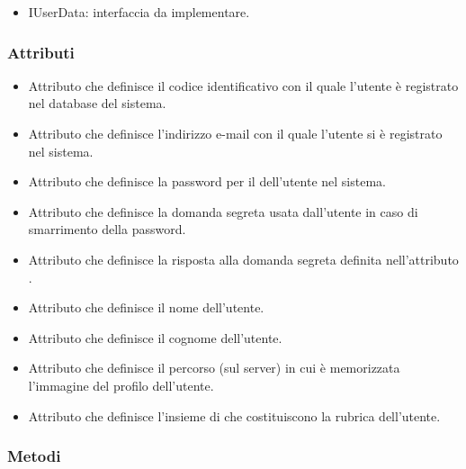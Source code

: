 \begin{itemize}
	\item{IUserData}: interfaccia da implementare.
\end{itemize}

\subsubsection*{Attributi}

\begin{itemize}
	\item{}
	Attributo che definisce il codice identificativo con il quale l'utente è registrato nel database del sistema.
	\item{}
	Attributo che definisce l'indirizzo e-mail con il quale l'utente si è registrato nel sistema.
	\item{}
	Attributo che definisce la password per il  dell'utente nel sistema.
	\item{}
	Attributo che definisce la domanda segreta usata dall'utente in caso di smarrimento della password.
	\item{}
	Attributo che definisce la risposta alla domanda segreta definita nell'attributo .
	\item{}
	Attributo che definisce il nome dell'utente.
	\item{}
	Attributo che definisce il cognome dell'utente.
	\item{}
	Attributo che definisce il percorso (sul server) in cui è memorizzata l'immagine del profilo dell'utente.
	\item{}
	Attributo che definisce l'insieme di  che costituiscono la rubrica dell'utente.
	
\end{itemize}

\subsubsection*{Metodi}

